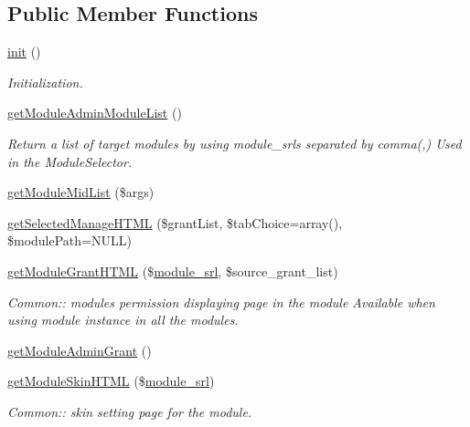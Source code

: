 \subsection*{Public Member Functions}
\begin{DoxyCompactItemize}
\item 
\hyperlink{classmoduleAdminModel_ad12d0ad0d64fc00df2ffef5d95446ff9}{init} ()
\begin{DoxyCompactList}\small\item\em Initialization. \end{DoxyCompactList}\item 
\hyperlink{classmoduleAdminModel_ab87a76519a343b50db20d17983b4d2c7}{get\+Module\+Admin\+Module\+List} ()
\begin{DoxyCompactList}\small\item\em Return a list of target modules by using module\+\_\+srls separated by comma(,) Used in the Module\+Selector. \end{DoxyCompactList}\item 
\hyperlink{classmoduleAdminModel_af1e58f7c102a8ee238f25ff2b193e6d7}{get\+Module\+Mid\+List} (\$args)
\item 
\hyperlink{classmoduleAdminModel_ada2b0f866658526c7cf2bb5876b0c087}{get\+Selected\+Manage\+H\+T\+ML} (\$grant\+List, \$tab\+Choice=array(), \$module\+Path=N\+U\+LL)
\item 
\hyperlink{classmoduleAdminModel_a0ab602897fb53096f7b232338c533839}{get\+Module\+Grant\+H\+T\+ML} (\$\hyperlink{ko_8install_8php_a370bb6450fab1da3e0ed9f484a38b761}{module\+\_\+srl}, \$source\+\_\+grant\+\_\+list)
\begin{DoxyCompactList}\small\item\em Common\+:\+: module\textquotesingle{}s permission displaying page in the module Available when using module instance in all the modules. \end{DoxyCompactList}\item 
\hyperlink{classmoduleAdminModel_a84f8431365473f8ddb70cb9cc1976db1}{get\+Module\+Admin\+Grant} ()
\item 
\hyperlink{classmoduleAdminModel_a7d52af7d5e35ad9ea0749a550e28e483}{get\+Module\+Skin\+H\+T\+ML} (\$\hyperlink{ko_8install_8php_a370bb6450fab1da3e0ed9f484a38b761}{module\+\_\+srl})
\begin{DoxyCompactList}\small\item\em Common\+:\+: skin setting page for the module. \end{DoxyCompactList}\item 

\end{DoxyCompactItemize}
